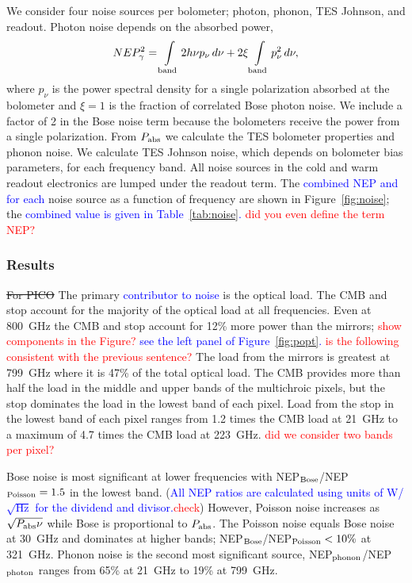 \documentclass[]{spie}  %
\newcommand{\comr}[1]{\textcolor{red}{#1}}
\newcommand{\comb}[1]{\textcolor{blue}{#1}}
\begin{document}
We consider four noise sources per bolometer; photon, phonon, TES Johnson, and readout. 
Photon noise depends on the absorbed power\cite{richards1994}, 
\begin{equation}
\label{eq:photon}
NEP_{\gamma}^2 = \int\limits_{\rm band} 2h\nu p_{\nu} \, d\nu + 2\xi \int\limits_{\rm band} p_{\nu}^2 \,  d\nu,
\end{equation} 
where $p_{\nu}$ is the power spectral density for a single polarization absorbed at the bolometer and $\xi=1$ is the fraction of correlated Bose 
photon noise. We include a factor of 2 in the Bose noise term because the bolometers receive the power from a single 
polarization. 
From $P_{\rm abs}$ we calculate the TES bolometer properties and phonon noise.\cite{mather1982}  
We calculate TES Johnson noise, which depends on bolometer bias parameters, for each frequency band.  
All noise sources in the cold and warm readout electronics are lumped under the readout term.  The \comb{combined NEP and for each} noise source as a function 
of frequency are shown in Figure~\ref{fig:noise}; the \comb{combined value is given in Table~\ref{tab:noise}.} \comr{did you even define the term NEP?}

\subsubsection{Results}  %

\sout{For PICO} The primary \comb{contributor to noise}  is the optical load.  The CMB and stop account for the majority of the optical load 
at all frequencies. Even at 800~GHz the CMB and stop
account for 12\% more power than the mirrors;  \comr{show components in the Figure?} \comb{see the left panel 
of Figure~\ref{fig:popt}.}
\comr{is the following consistent with the previous sentence?} The load from the mirrors is greatest at 799~GHz where it is 47\% of the total 
optical load. The CMB provides more than half the load 
in the middle and upper bands of the multichroic pixels, but the stop dominates the load in the lowest band of each pixel.  
Load from the stop in the lowest band of each pixel ranges from 1.2 times the CMB load at 21~GHz to a maximum of 4.7 
times the CMB load at 223~GHz. \comr{did we consider two bands per pixel? }

Bose noise is most significant 
at lower frequencies with NEP$_{\rm Bose}$/NEP$_{\rm Poisson}= 1.5 $ in the lowest band. (\comb{All NEP ratios are calculated using 
units of W/$\sqrt{\mbox{Hz}}$ for the dividend and divisor.}\comr{check})   However, Poisson noise increases as 
$\sqrt{P_{\rm abs}\nu}$ while Bose is proportional to $P_{\rm abs}$. The Poisson noise equals Bose noise at 30~GHz and dominates at higher bands; 
NEP$_{\rm Bose}$/NEP$_{\rm Poisson} <10\%$ at 321~GHz. 
Phonon noise is the second most significant source, NEP$_{\rm phonon}$/NEP$_{\rm photon}$ ranges from 65\% at 21~GHz 
to 19\% at 799~GHz. 
\end{document}
